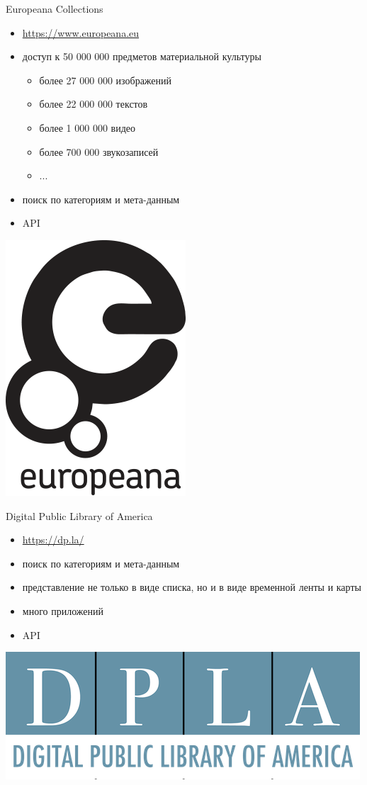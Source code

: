 \documentclass[13pt, t]{beamer}
\begin{document}
\begin{frame}{Europeana Collections}
\begin{itemize}
\item \href{https://www.europeana.eu}{\alert {https://www.europeana.eu}}
\item доступ к 50 000 000 предметов материальной культуры
\begin{itemize}
\item  более 27 000 000 изображений
\item  более 22 000 000 текстов
\item  более 1 000 000 видео
\item  более 700 000 звукозаписей
\item  ...
\end{itemize}
\item поиск по категориям и мета-данным
\item API
\end{itemize}
\vfill
\begin{center}
\includegraphics[width=0.3\linewidth]{images/02-europeana.png}
\end{center}
\end{frame}

\begin{frame}{Digital Public Library of America}
\begin{itemize}
\item \href{https://dp.la/}{\alert {https://dp.la/}}
\item поиск по категориям и мета-данным
\item представление не только в виде списка, но и в виде временной ленты и карты
\item много приложений
\item API
\end{itemize}
\vfill
\begin{center}
\includegraphics[width=0.5\linewidth]{images/03-dpla.png}
\end{center}
\end{frame}
\end{document}
